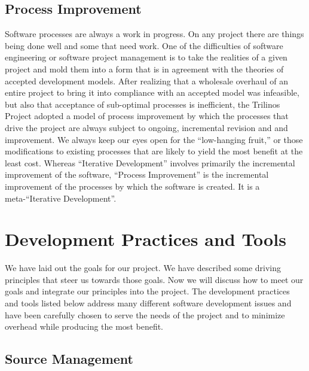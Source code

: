 \documentclass[12pt,relax]{article}
\begin{document}
\subsection{Process Improvement}

Software processes are always a work in progress.  On any project there are
things being done well and some that need work.  One of the difficulties of 
software engineering or software project management is to take the realities
of a given project and mold them into a form that is in agreement with the
theories of accepted development models.  After realizing that a wholesale 
overhaul of an entire project to bring it into compliance with an accepted
model was infeasible, but also that acceptance of sub-optimal processes is
inefficient, the Trilinos Project adopted a model of process improvement by
which the processes that drive the project are always subject to ongoing,
incremental revision and and improvement.  We always keep our eyes open for the 
``low-hanging fruit,'' or those modifications to existing processes that are
likely to yield the most benefit at the least cost.  Whereas ``Iterative
Development'' involves primarily the incremental improvement of the software,
``Process Improvement'' is the incremental improvement of the processes by which
the software is created.  It is a meta-``Iterative Development''.

\clearpage


\section{Development Practices and Tools}
\label{Section:DevelopmentPracticesTools}

We have laid out the goals for our project.  We have described some driving
principles that steer us towards those goals.  Now we will discuss how to meet 
our goals and integrate our principles into the project.  The development
practices and tools listed below address many different software development
issues and have been carefully chosen to serve the needs of the project and to
minimize overhead while producing the most benefit.


\subsection{Source Management}
\end{document}
